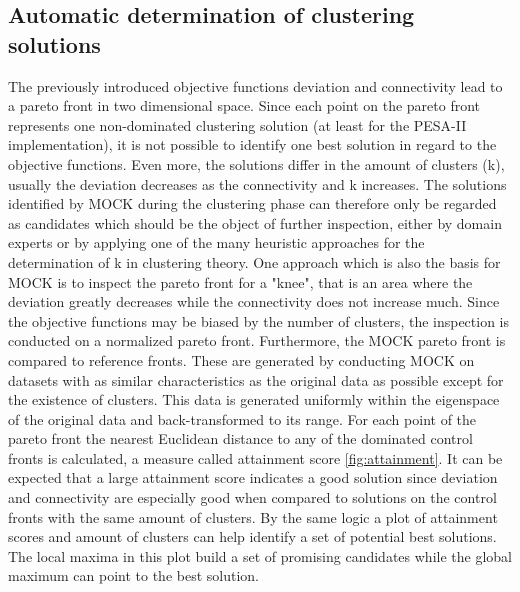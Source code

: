 \documentclass[parskip=half,DIV=14]{scrartcl}\usepackage[]{graphicx}\usepackage[]{color}
\begin{document}
\subsection{Automatic determination of clustering solutions}
The previously introduced objective functions deviation and connectivity lead to a pareto front in two dimensional space. Since each point on the pareto front represents one non-dominated clustering solution (at least for the PESA-II implementation), it is not possible to identify one best solution in regard to the objective functions. Even more, the solutions differ in the amount of clusters (k), usually the deviation decreases as the connectivity and k increases. The solutions identified by MOCK during the clustering phase can therefore only be regarded as candidates which should be the object of further inspection, either by domain experts or by applying one of the many heuristic approaches for the determination of k in clustering theory. One approach which is also the basis for MOCK is to inspect the pareto front for a "knee", that is an area where the deviation greatly decreases while the connectivity does not increase much. Since the objective functions may be biased by the number of clusters, the inspection is conducted on a normalized pareto front. Furthermore, the MOCK pareto front is compared to reference fronts. These are generated by conducting MOCK on datasets with as similar characteristics as the original data as possible except for the existence of clusters. This data is generated uniformly within the eigenspace of the original data and back-transformed to its range. For each point of the pareto front the nearest Euclidean distance to any of the dominated control fronts is calculated, a measure called attainment score \ref{fig:attainment}. It can be expected that a large attainment score indicates a good solution since deviation and connectivity are especially good when compared to solutions on the control fronts with the same amount of clusters. By the same logic a plot of attainment scores and amount of clusters can help identify a set of potential best solutions\label{fig:attainment}. The local maxima in this plot build a set of promising candidates while the global maximum can point to the best solution. \cite{handl}



\end{document}
